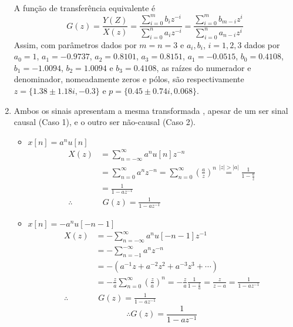 \documentclass{article}
\begin{document}
\begin{enumerate}
A função de transferência equivalente é
\begin{equation}
G(z) = \frac{Y(Z)}{X(z)} = \frac{\sum_{i=0}^{m} b_{i} z^{-i}}{\sum_{i=0}^{n} a_{i} z^{-i}} = \frac{\sum_{i=0}^{m} b_{m-i} z^{i}}{\sum_{i=0}^{n} a_{n-i} z^{i}}
\end{equation}
Assim, com parâmetros dados por $m = n = 3$ e $a_i, b_i$, $i = 1, 2, 3$ dados por $a_0 = 1$, $a_1 = -0.9737$, $a_2 = 0.8101$, $a_3 = 0.8151$, $a_1 = -0.0515$, $b_0 = 0.4108$, $b_1 = -1.0094$, $b_2 = 1.0094$ e $b_3 = 0.4108$, as raízes do numerador e denominador, nomeadamente zeros e pólos, são respectivamente $z = \{1.38 \pm 1.18 i, -0.3\}$ e $p = \{0.45 \pm 0.74i, 0.068\}$.

\item %
Ambos os sinais apresentam a mesma transformada , apesar de um ser sinal causal (Caso 1), e o outro ser não-causal (Caso 2).

\begin{itemize}
\item $x[n] = a^n u[n]$
\begin{equation}
\begin{split}
X(z) &= \sum_{n = -\infty}^{\infty} a^n u[n] z^{-n} \\
& = \sum_{n 
= 0}^{\infty} a^n z^{-n} = \sum_{n = 0}^{\infty} (\frac{a}{z})^n \stackrel{|z| > |a|}{=} \frac{1}{1 - \frac{a}{z}} \\
&= \frac{1}{1 - a z^{-1}} \\
\therefore & \,\, G(z) = \frac{1}{1 - a z^{-1}}
\end{split}
\end{equation}
\item $x[n] = -a^n u[-n-1]$
\begin{equation}
\begin{split}
X(z) &= - \sum_{n = - \infty}^{\infty} a^n u[-n - 1] z^{-1} \\
&= - \sum_{n = -1}^{-\infty} a^n z^{-n} \\
&= -\left(a^{-1}z + a^{-2} z^2 + a^{-3} z^3 + \cdots\right) \\
&= -\frac{z}{a} \sum_{n = 0}^{\infty} (\frac{z}{a})^n = - \frac{z}{a} \frac{1}{1 - \frac{z}{a}} = \frac{z}{z-a} = \frac{1}{1 - a z^{-1}} \\
\therefore & \,\, G(z) = \frac{1}{1 - a z^{-1}}
\end{split}
\end{equation}
\begin{equation}
\therefore G(z) = \frac{1}{1 - a z^{-1}}
\end{equation}
\end{itemize}
\end{enumerate}
\end{document}
